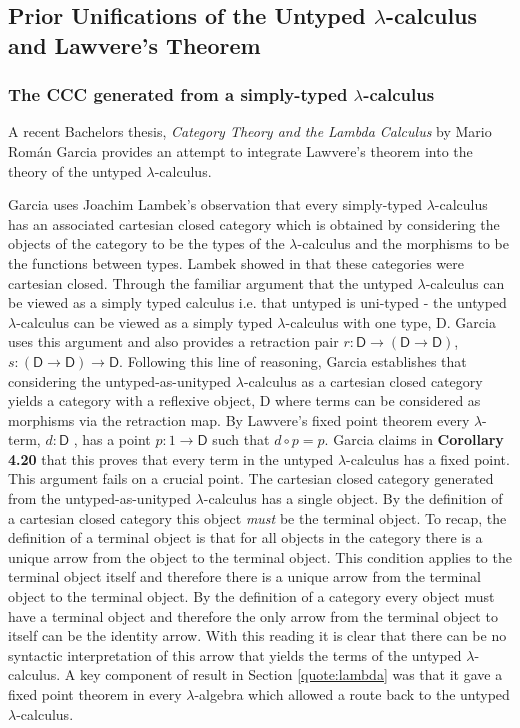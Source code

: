\subsection{Prior Unifications of the Untyped $\lambda$-calculus and
Lawvere's Theorem}
\label{quote:prior}
\subsubsection{The CCC generated from a simply-typed $\lambda$-calculus}


A recent Bachelors thesis, \textit{Category Theory and the Lambda Calculus} by Mario
Rom\'an Garcia \cite{garcia2018thesis} provides an attempt to integrate Lawvere's theorem into the
theory of the untyped $\lambda$-calculus.

Garcia uses Joachim Lambek's observation that every simply-typed
$\lambda$-calculus has an associated cartesian closed category which is obtained
by considering the objects of the category to be the types of the
$\lambda$-calculus and the morphisms to be the functions between types. Lambek
showed in \cite{lambek1985cartesian} that these categories were cartesian closed. Through the
familiar argument that the untyped $\lambda$-calculus can
be viewed as a simply typed calculus i.e.  that untyped is uni-typed - the
untyped $\lambda$-calculus can be viewed as a simply typed $\lambda$-calculus
with one type, \textsf{D}. Garcia uses this argument and also provides a
retraction pair $r : \textsf{D} \rightarrow (\textsf{D} \rightarrow
\textsf{D})$, $s : (\textsf{D} \rightarrow \textsf{D}) \rightarrow \textsf{D}$.
Following this line of reasoning, Garcia establishes that considering the
untyped-as-unityped $\lambda$-calculus as a cartesian closed category yields a
category with a reflexive object, \textsf{D} where terms can be considered as
morphisms via the retraction map. By Lawvere's fixed point theorem every
$\lambda$-term, $d : \textsf{D}$ , has a point $p: 1 \rightarrow \textsf{D}$
such that $d \circ p = p$. Garcia claims in \textbf{Corollary 4.20} that this
proves that every term in the untyped $\lambda$-calculus has a fixed point. This
argument fails on a crucial point. The cartesian closed category generated from
the untyped-as-unityped $\lambda$-calculus has a single object. By the
definition of a cartesian closed category this object \textit{must} be the
terminal object. To recap, the definition of a terminal object is that for all
objects in the category there is a unique arrow from the object to the terminal
object. This condition applies to the terminal object itself and therefore there
is a unique arrow from the terminal object to the terminal object. By the
definition of a category every object must have a terminal object and therefore
the only arrow from the terminal object to itself can be the identity arrow.
With this reading it is clear that there can be no syntactic interpretation of
this arrow that yields the terms of the untyped $\lambda$-calculus. A key
component of result in Section \ref{quote:lambda}  was that it gave a fixed point
theorem in every $\lambda$-algebra which allowed a route back to the untyped
$\lambda$-calculus.

